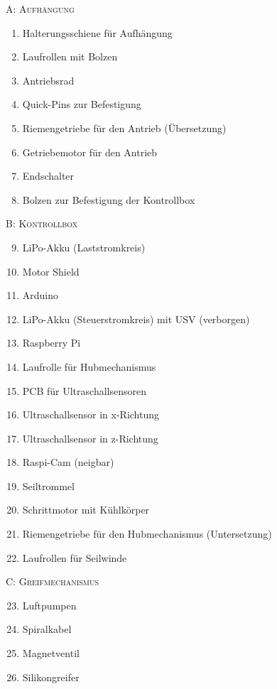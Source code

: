 \begin{multicols}{2}

\textsc{A: Aufhängung}

\begin{enumerate}
    \item Halterungsschiene für Aufhängung
    \item Laufrollen mit Bolzen
    \item Antriebsrad
    \item Quick-Pins zur Befestigung
    \item Riemengetriebe für den Antrieb (Übersetzung)
    \item Getriebemotor für den Antrieb
    \item Endschalter
    \item Bolzen zur Befestigung der Kontrollbox
\end{enumerate}

\textsc{B: Kontrollbox}

\begin{enumerate}
\setcounter{enumi}{8}
    \item LiPo-Akku (Laststromkreis)
    \item Motor Shield
    \item Arduino
    \item LiPo-Akku (Steuerstromkreis) mit USV (verborgen)
    \item Raspberry Pi
    \item Laufrolle für Hubmechanismus
    \item PCB für Ultraschallsensoren
    \item Ultraschallsensor in x-Richtung
    \item Ultraschallsensor in z-Richtung
    \item Raspi-Cam (neigbar)
    \item Seiltrommel
    \item Schrittmotor mit Kühlkörper
    \item Riemengetriebe für den Hubmechanismus (Untersetzung)
    \item Laufrollen für Seilwinde
\end{enumerate}

\textsc{C: Greifmechanismus}

\begin{enumerate}
\setcounter{enumi}{22}
    \item Luftpumpen
    \item Spiralkabel
    \item Magnetventil
    \item Silikongreifer
\end{enumerate}

\end{multicols}

